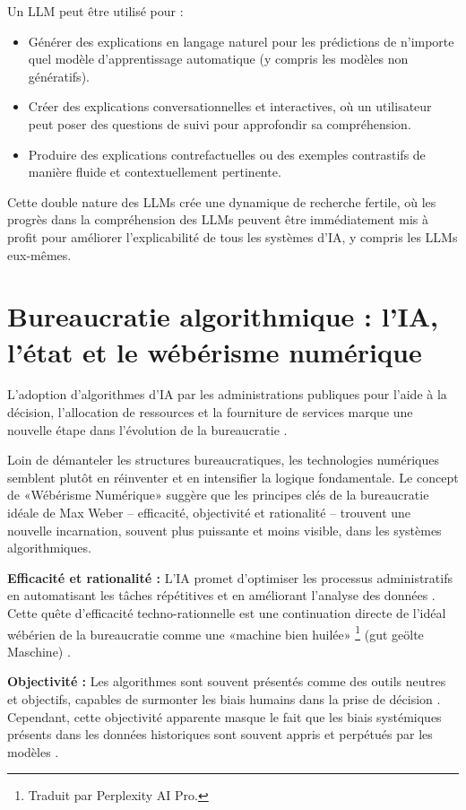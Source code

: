 Un LLM peut être utilisé pour :
\begin{itemize}[label=\textbullet]
    \item Générer des explications en langage naturel pour les prédictions de n'importe quel modèle d'apprentissage automatique (y compris les modèles non génératifs).
    \item Créer des explications conversationnelles et interactives, où un utilisateur peut poser des questions de suivi pour approfondir sa compréhension.
    \item Produire des explications contrefactuelles ou des exemples contrastifs de manière fluide et contextuellement pertinente.
\end{itemize}

Cette double nature des LLMs crée une dynamique de recherche fertile, où les progrès dans la compréhension des LLMs peuvent être immédiatement mis à profit pour améliorer l'explicabilité de tous les systèmes d'IA, y compris les LLMs eux-mêmes.

\section{Bureaucratie algorithmique : l'IA, l'état et le wébérisme numérique}
L'adoption d'algorithmes d'IA par les administrations publiques pour l'aide à la décision, l'allocation de ressources et la fourniture de services marque une nouvelle étape dans l'évolution de la bureaucratie \citet{Busuioc2021Accountable}.

Loin de démanteler les structures bureaucratiques, les technologies numériques semblent plutôt en réinventer et en intensifier la logique fondamentale. Le concept de «Wébérisme Numérique» \citet{Muellerleile2018Digital} suggère que les principes clés de la bureaucratie idéale de Max Weber – efficacité, objectivité et rationalité – trouvent une nouvelle incarnation, souvent plus puissante et moins visible, dans les systèmes algorithmiques.

\textbf{Efficacité et rationalité :} L'IA promet d'optimiser les processus administratifs en automatisant les tâches répétitives et en améliorant l'analyse des données \citet{van2022Artificial}. Cette quête d'efficacité techno-rationnelle est une continuation directe de l'idéal wébérien de la bureaucratie comme une «machine bien huilée» \footnote{Traduit par Perplexity AI Pro.} (gut geölte Maschine) \citet{Weber2002Economy}.

\textbf{Objectivité :} Les algorithmes sont souvent présentés comme des outils neutres et objectifs, capables de surmonter les biais humains dans la prise de décision \citet{Janssen2024The}. Cependant, cette objectivité apparente masque le fait que les biais systémiques présents dans les données historiques sont souvent appris et perpétués par les modèles \citep{Busuioc2021Accountable, Diakopoulos2014}.

